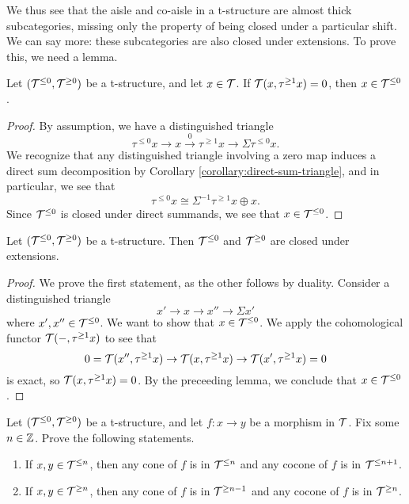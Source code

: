 We thus see that the aisle and co-aisle in a t-structure are almost thick subcategories, missing only the property of being closed under a particular shift.
We can say more: these subcategories are also closed under extensions. To prove this, we need a lemma.
\begin{lemma}\label{lemma:t-structure-aisle-from-trivial-mapping-to-truncation}
	Let \((\mathcal{T}^{\leq 0},\mathcal{T}^{\geq0})\) be a t-structure, and let \(x\in\mathcal{T}\). If \(\mathcal{T}(x,\tau^{\geq 1}x)=0\), then \(x\in\mathcal{T}^{\leq 0}\).
\end{lemma}
\begin{proof}
By assumption, we have a distinguished triangle
\[ \tau^{\leq 0}x\to x \overset{0}\to \tau^{\geq 1}x \to \Sigma\tau^{\leq 0}x. \]
We recognize that any distinguished triangle involving a zero map induces a direct sum decomposition by Corollary \ref{corollary:direct-sum-triangle}, and in particular, we see that
\[ \tau^{\leq 0}x\cong \Sigma^{-1}\tau^{\geq 1}x \oplus x. \]
Since \(\mathcal{T}^{\leq 0}\) is closed under direct summands, we see that \(x\in\mathcal{T}^{\leq 0}\).
\end{proof}
\begin{proposition}\label{prop:t-structure-closure-under-extension}
	Let \((\mathcal{T}^{\leq 0},\mathcal{T}^{\geq0})\) be a t-structure. Then \(\mathcal{T}^{\leq 0}\) and \(\mathcal{T}^{\geq 0}\) are closed under extensions.
\end{proposition}
\begin{proof}
We prove the first statement, as the other follows by duality. Consider a distinguished triangle
\[ x' \to x \to x'' \to \Sigma x' \]
where \(x',x''\in\mathcal{T}^{\leq 0}\). We want to show that \(x\in\mathcal{T}^{\leq 0}\). We apply the cohomological functor \(\mathcal{T}(-,\tau^{\geq 1}x)\) to see that
\[ 0 = \mathcal{T}(x'',\tau^{\geq 1}x) \to \mathcal{T}(x,\tau^{\geq 1}x) \to \mathcal{T}(x',\tau^{\geq 1}x) = 0 \]
is exact, so \(\mathcal{T}(x,\tau^{\geq 1}x) = 0\). By the preceeding lemma, we conclude that \(x\in\mathcal{T}^{\leq 0}\).
\end{proof}
\begin{exercise}\label{exercise:t-structures-cones-of-morphisms-in-aisle}
	Let \((\mathcal{T}^{\leq 0},\mathcal{T}^{\geq0})\) be a t-structure, and let \(f\!:x\to y\) be a morphism in \(\mathcal{T}\). Fix some \(n\in\mathbb{Z}\). Prove the following statements.
	\begin{enumerate}[label=(\arabic*)]
		\item If \(x,y\in\mathcal{T}^{\leq n}\), then any cone of \(f\) is in \(\mathcal{T}^{\leq n}\) and any cocone of \(f\) is in \(\mathcal{T}^{\leq n+1}\).
		\item If \(x,y\in\mathcal{T}^{\geq n}\), then any cone of \(f\) is in \(\mathcal{T}^{\geq n-1}\) and any cocone of \(f\) is in \(\mathcal{T}^{\geq n}\).
	\end{enumerate}
\end{exercise}

